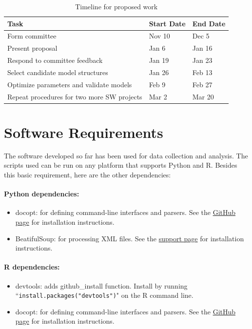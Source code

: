 \documentclass[a4paper]{scrartcl}
\begin{document}
\begin{table}[h]
\caption{Timeline for proposed work}
\centering
\begin{tabular}{ p{2.5in} l l}
\hline\hline
Task & Start Date & End Date \\
\hline
Form committee & Nov 10 & Dec 5 \\
Present proposal & Jan 6 & Jan 16 \\
Respond to committee feedback & Jan 19 & Jan 23 \\
Select candidate model structures & Jan 26 & Feb 13 \\
Optimize parameters and validate models & Feb 9 & Feb 27 \\
Repeat procedures for two more SW projects & Mar 2 & Mar 20 \\
\hline
\end{tabular}
\label{tab:timeline}
\end{table}

\appendix
\section{Software Requirements}
\label{sw_reqs}
The software developed so far has been used for data collection and analysis. The scripts used can be run on any platform that supports Python and R. Besides this basic requirement, here are the other dependencies:
\paragraph{Python dependencies:}
\begin{itemize}
\item
docopt: for defining command-line interfaces and parsers. See the \href{https://github.com/docopt/docopt}{GitHub page} for installation instructions.
\item
BeatifulSoup: for processing XML files. See the \href{http://www.crummy.com/software/BeautifulSoup}{support page} for installation instructions.
\end{itemize}

\paragraph{R dependencies:}
\begin{itemize}
\item
devtools: adds github\_install function. Install by running ``\verb|install.packages("devtools")|" on the R command line.
\item{docopt: for defining command-line interfaces and parsers. See the \href{https://github.com/edwindj/docopt.R}{GitHub page} for installation instructions.}
\end{itemize}




\end{document}
